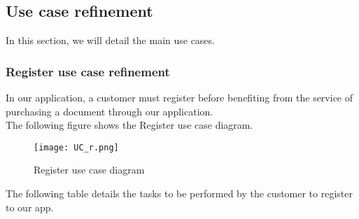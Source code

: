 \subsection{Use case refinement}
In this section, we will detail the main use cases.
\subsubsection{Register use case refinement}
In our application, a customer must register before benefiting from the service of purchasing a document through our application.\\
The following figure shows the Register use case diagram.
\begin{figure}[H]%
    \center   
    \texttt{[image: UC\_r.png]}
    \caption{Register use case diagram}
\end{figure}
\pagebreak
The following table details the tasks to be performed by the customer to register
to our app.

